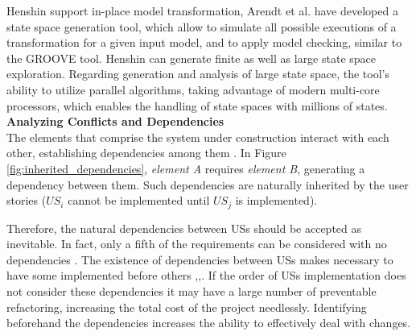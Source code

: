 Henshin support in-place model transformation, Arendt et al. have developed a state space generation tool, which allow to simulate all possible executions of a transformation for a given input model, and to apply model checking, similar to the GROOVE \cite{kastenberg2006model} tool. Henshin can generate finite as well as large state space exploration. Regarding generation and analysis of large state space, the tool’s ability to utilize parallel algorithms, taking advantage of modern multi-core processors, which enables the handling of state spaces with millions of states. \\ 
\textbf{Analyzing Conﬂicts and Dependencies}\\ 
The elements that comprise the system under construction interact with each other, establishing dependencies among them \cite{kastenberg2006model}. In Figure \ref{fig:inherited_dependencies}, \emph{element A} requires \emph{element B}, generating a dependency between them. Such dependencies are naturally inherited by the user stories ($US_i$ 
cannot be implemented until $US_j$ is implemented). 

Therefore, the natural dependencies between USs should be accepted as inevitable. In fact, only a fifth of the requirements can be considered with no dependencies \cite{carlshamre2001industrial}. The existence of dependencies between USs makes necessary to have some implemented before others \cite{carlshamre2001industrial},\cite{Greer2004},\cite{logue2008handling}. If the order of USs implementation does not consider these dependencies it may have a large number of preventable refactoring, increasing the total cost of the project needlessly. Identifying beforehand the dependencies increases the ability to effectively deal with changes. 

